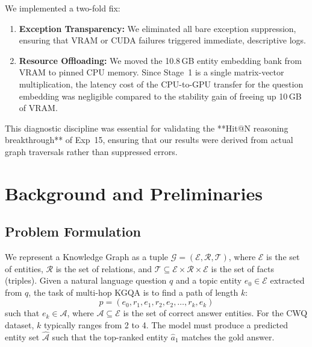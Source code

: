 \documentclass[11pt,a4paper]{article}
\begin{document}
We implemented a two-fold fix:
\begin{enumerate}
    \item \textbf{Exception Transparency:} We eliminated all bare exception
          suppression, ensuring that VRAM or CUDA failures triggered immediate,
          descriptive logs.
    \item \textbf{Resource Offloading:} We moved the 10.8\,GB entity embedding
          bank from VRAM to pinned CPU memory. Since Stage~1 is a single
          matrix-vector multiplication, the latency cost of the CPU-to-GPU
          transfer for the question embedding was negligible compared to the
          stability gain of freeing up 10\,GB of VRAM.
\end{enumerate}
This diagnostic discipline was essential for validating the **Hit@N reasoning
breakthrough** of Exp~15, ensuring that our results were derived from actual
graph traversals rather than suppressed errors.


\section{Background and Preliminaries}
\label{sec:background}

\subsection{Problem Formulation}
We represent a Knowledge Graph as a tuple $\mathcal{G} = (\mathcal{E}, \mathcal{R}, \mathcal{T})$,
where $\mathcal{E}$ is the set of entities, $\mathcal{R}$ is the set of
relations, and $\mathcal{T} \subseteq \mathcal{E} \times \mathcal{R} \times \mathcal{E}$
is the set of facts (triples).
Given a natural language question $q$ and a topic entity $e_0 \in \mathcal{E}$
extracted from $q$, the task of multi-hop KGQA is to find a path of length $k$:
\[
  p = (e_0, r_1, e_1, r_2, e_2, \dots, r_k, e_k)
\]
such that $e_k \in \mathcal{A}$, where $\mathcal{A} \subseteq \mathcal{E}$ is the
set of correct answer entities.
For the CWQ dataset, $k$ typically ranges from 2 to 4.
The model must produce a predicted entity set $\hat{\mathcal{A}}$ such that
the top-ranked entity $\hat{a}_1$ matches the gold answer.
\end{document}

